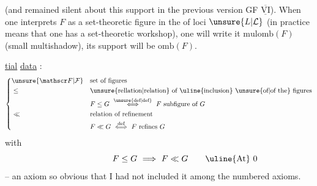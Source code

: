 (and  remained silent about this support in the previous version GF $\underline{\overline{\mathrm{VI}}}$). When one interprets $F$ as a set-theoretic figure in the  of loci $\unsure{L|\mathcal L}$  (in practice  means that one has a set-theoretic workshop), one will write it $\mathrm{mulomb}(F)$ (small multishadow), its support will be $\mathrm{omb}(F)$.

\uline{tial} \uline{data} :
\[
\left\{\begin{aligned}
&\unsure{\mathscr F|\mathcal F} &&\text{set of figures}\\
&\leq &&\text{\unsure{rellation|relation} of \uline{inclusion} \unsure{of|of the} figures}\\
& &&F\leq G\ \overset{\text{\unsure{def|def}}}{\Longleftrightarrow}\ F\ \text{subfigure of }G\\
&\ll &&\text{relation of refinement}\\
& && F\ll G\ \overset{\text{def}}{\Longleftrightarrow}\ F\ \text{refines }G
\end{aligned}\right.
\]
with
\[
F\leq G\ \Longrightarrow\ F\ll G\tag*{\makebox[0pt][r]{\makebox[\displaywidth][l]{\uline{At} 0}}}
\]
-- an axiom so obvious that I had not included it among the numbered axioms.

